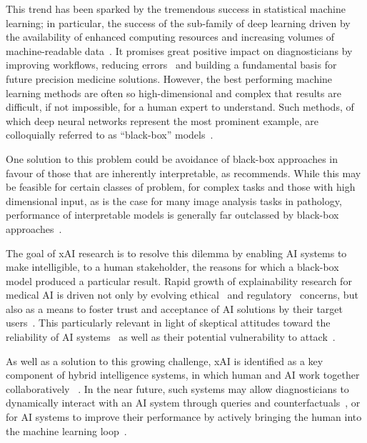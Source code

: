 This trend has been sparked by the tremendous success in statistical machine learning; in particular, the success of the sub-family of deep learning driven by the availability of enhanced computing resources and increasing volumes of machine-readable data~\cite{LeCunBengioHinton:2015:DeepLearningNature}. It promises great positive impact on diagnosticians by improving workflows, reducing errors~\cite{Topol:2019:NatureMedicine} and building a fundamental basis for future precision medicine solutions. However, the best performing machine learning methods are often so high-dimensional and complex that results are difficult, if not impossible, for a human expert to understand. Such methods, of which deep neural networks represent the most prominent example, are colloquially referred to as ``black-box'' models~\cite{Castelvecchi:2016:OpenBlack}.

One solution to this problem could be avoidance of black-box approaches in favour of those that are inherently interpretable, as \citet{Rudin:2019:interpretable} recommends. While this may be feasible for certain classes of problem, for complex tasks and those with high dimensional input, as is the case for many image analysis tasks in pathology, performance of interpretable models is generally far outclassed by black-box approaches~\cite{arrieta2020explainable, Holzinger:2020:explainable}.

The goal of xAI research is to resolve this dilemma by enabling AI systems to make intelligible, to a human stakeholder, the reasons for which a black-box model produced a particular result. Rapid growth of explainability research for medical AI is driven not only by evolving ethical~\cite{MuellerEtAl:2021:TenCommandments} and regulatory~\cite{Schneeberger:2020:legalAI} concerns, but also as a means to foster trust and acceptance of AI solutions by their target users~\cite{GuidottiPedreschi:2019:Survey, ProsperiEtAl:2020:CausalHealth, Ferrario:trustmedicalai, gaube:trustmedicalai:2021, kastner2021relation}. This particularly relevant in light of skeptical attitudes toward the reliability of AI systems~\cite{quinn:trustmedicalai:2020, tosun_histomapr_2020} as well as their potential vulnerability to attack~\cite{finlayson2019adversarial, foote2021now}.


As well as a solution to this growing challenge, xAI is identified as a key component of hybrid intelligence systems, in which human and AI work together collaboratively ~\cite{hemmer2021human}. In the near future, such systems may allow diagnosticians to dynamically interact with an AI system through queries and counterfactuals~\cite{HolzingerEtAl:2021:GraphFusion, tosun_histomapr_2020}, or for AI systems to improve their performance by actively bringing the human into the machine learning loop~\cite{Holzinger:2020:explainable}.

